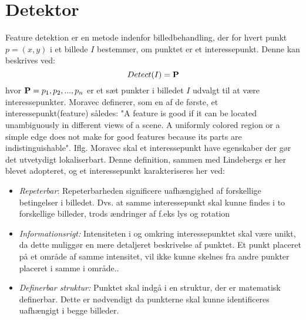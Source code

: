 \section{Detektor}\label{sec:detect}
Feature detektion er en metode indenfor billedbehandling, der for hvert punkt $p = (x,y)$ i et billede $I$ bestemmer, om punktet er et interessepunkt. Denne kan beskrives ved:
\begin{equation}
Detect(I)= \bold{P}
\label{detect}
\end{equation}
hvor $\bold{P} = {p_1, p_2,..., p_n}$ er et sæt punkter i billedet $I$ udvalgt til at være interessepunkter. Moravec \cite{moravec} definerer, som en af de første, et interessepunkt(feature) således: "A
feature is good if it can be located unambiguously in different views of a scene. A
uniformly colored region or a simple edge does not make for good features because
its parts are indistinguishable". Iflg. Moravec skal et interessepunkt have egenskaber der gør det utvetydigt lokaliserbart. Denne definition, sammen med Lindebergs \cite{pointsurvey} er her blevet adopteret, og et interessepunkt karakteriseres her ved:
\begin{itemize}
\item{\emph{Repeterbar}: Repeterbarheden significere uafhængighed af forskellige betingelser i billedet. Dvs. at samme interessepunkt skal kunne findes i to forskellige billeder, trods ændringer af f.eks lys og rotation}
\item{\emph{Informationsrigt:}
Intensiteten i og omkring interessepunktet skal være unikt, da dette muliggør en mere detaljeret beskrivelse af punktet. Et punkt placeret på et område af samme intensitet, vil ikke kunne skelnes fra andre punkter placeret i samme i område..}
\item{\textit{Definerbar struktur:} Punktet skal indgå i en struktur, der er matematisk definerbar. Dette er nødvendigt da punkterne skal kunne identificeres uafhængigt i begge billeder.}
\end{itemize}
\raggedbottom
\raggedbottom